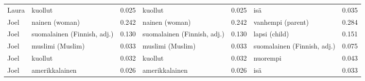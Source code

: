 \begin{longtable}{llrlrlr}
 Laura &                     kuollut &                            0.025 &                     kuollut &                                 0.025 &                         isä &                           0.035 \\
  Joel &              nainen (woman) &                            0.242 &              nainen (woman) &                                 0.242 &           vanhempi (parent) &                           0.284 \\
  Joel & suomalainen (Finnish, adj.) &                            0.130 & suomalainen (Finnish, adj.) &                                 0.130 &               lapsi (child) &                           0.151 \\
  Joel &            muslimi (Muslim) &                            0.033 &            muslimi (Muslim) &                                 0.033 & suomalainen (Finnish, adj.) &                           0.075 \\
  Joel &                     kuollut &                            0.032 &                     kuollut &                                 0.032 &                    nuorempi &                           0.043 \\
  Joel &              amerikkalainen &                            0.026 &              amerikkalainen &                                 0.026 &                         isä &                           0.033 \\
\end{longtable}
